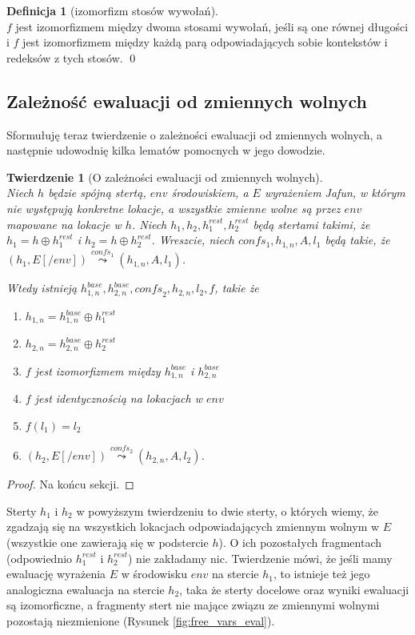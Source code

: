 \documentclass[]{pracamgr}
\renewcommand \| {\hspace{0.75em} | \hspace{0.75em} }
\renewcommand \[ {[\![}
\renewcommand \] {]\!]}
\newcommand \eval [1] {\overset{#1}{\leadsto}}
\newtheorem{theorem}{Twierdzenie}
\theoremstyle{definition}
\newtheorem{definition}{Definicja}[section]
\begin{document}
\begin{definition}[izomorfizm stosów wywołań] {\ } \\
$f$ jest izomorfizmem między dwoma stosami wywołań, jeśli są one równej długości
i $f$ jest izomorfizmem między każdą parą odpowiadających sobie kontekstów i redeksów z tych stosów.
\qed
\end{definition}

\newcommand{\hrest}{h^{rest}}
\newcommand{\hbase}{h^{base}}

\subsection{Zależność ewaluacji od zmiennych wolnych}
Sformułuję teraz twierdzenie o zależności ewaluacji od zmiennych wolnych,
a następnie udowodnię kilka lematów pomocnych w jego dowodzie.
\begin{theorem}[O zależności ewaluacji od zmiennych wolnych]{\ } \\
\label{th:free_eval}
    Niech $h$ będzie spójną stertą, $env$ środowiskiem,
    a $E$ wyrażeniem Jafun, w którym nie występują konkretne lokacje, a wszystkie zmienne wolne są przez $env$ mapowane
    na lokacje w $h$.
    Niech $h_1, h_2, \hrest_1, \hrest_2$ będą stertami takimi, że
    $h_1 = h \oplus \hrest_1$ i $h_2 = h \oplus \hrest_2$.
    Wreszcie, niech $\mathit{confs_1}, h_{1,n}, A, l_1$ będą takie, że $(h_1, E[/env]) \eval{confs_1} (h_{1,n}, A, l_1)$.
    
    Wtedy istnieją  $\hbase_{1, n}, \hbase_{2, n}, \mathit{confs}_2, h_{2, n}, l_2, f$, takie że
    \begin{enumerate}
     \item $h_{1, n} = \hbase_{1, n} \oplus \hrest_1$
     \item $h_{2, n} = \hbase_{2, n} \oplus \hrest_2$
     \item $f$ jest izomorfizmem między $\hbase_{1, n}$ i $\hbase_{2, n}$
     \item $f$ jest identycznością na lokacjach w $env$
     \item $f(l_1) = l_2$
     \item $(h_2, E[/env]) \eval{confs_2} (h_{2,n}, A, l_2)$.
    \end{enumerate}
\end{theorem}
\begin{proof}
Na końcu sekcji.
\end{proof}

Sterty $h_1$ i $h_2$ w powyższym twierdzeniu to dwie sterty, o których wiemy, że zgadzają się
na wszystkich lokacjach odpowiadających zmiennym wolnym w $E$ (wszystkie one zawierają się w podstercie $h$).
O ich pozostałych fragmentach (odpowiednio $\hrest_1$ i $\hrest_2$) nie zakładamy nic.
Twierdzenie mówi, że jeśli mamy ewaluację wyrażenia $E$ w środowisku $env$ na stercie $h_1$,
to istnieje też jego analogiczna ewaluacja na stercie $h_2$,
taka że sterty docelowe oraz wyniki ewaluacji są izomorficzne, a fragmenty stert nie mające związu ze zmiennymi wolnymi
pozostają niezmienione (Rysunek \ref{fig:free_vars_eval}).
\end{document}
